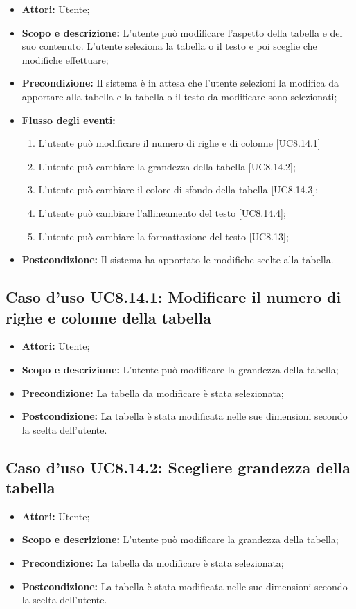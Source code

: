 \begin{itemize}
	\item \textbf{Attori:} Utente;
	\item \textbf{Scopo e descrizione:} L'utente può modificare l'aspetto della tabella e del suo contenuto. L'utente seleziona la tabella o il testo e poi sceglie che modifiche effettuare;
	\item \textbf{Precondizione:} Il sistema è in attesa che l'utente selezioni la modifica da apportare alla tabella e la tabella o il testo da modificare sono selezionati;
	\item \textbf{Flusso degli eventi:}
	\begin{enumerate}
		\item L'utente può modificare il numero di righe e di colonne [UC8.14.1]
		\item L'utente può cambiare la grandezza della tabella [UC8.14.2];
		\item L'utente può cambiare il colore di sfondo della tabella [UC8.14.3];
		\item L'utente può cambiare l'allineamento del testo [UC8.14.4];
		\item L'utente può cambiare la formattazione del testo [UC8.13];
	\end{enumerate}
	\item \textbf{Postcondizione:} Il sistema ha apportato le modifiche scelte alla tabella.
\end{itemize}

\subsection{Caso d'uso UC8.14.1: Modificare il numero di righe e colonne della tabella}
\begin{itemize}
	\item \textbf{Attori:} Utente;
	\item \textbf{Scopo e descrizione:} L'utente può modificare la grandezza della tabella;
	\item \textbf{Precondizione:} La tabella da modificare è stata selezionata;
	\item \textbf{Postcondizione:} La tabella è stata modificata nelle sue dimensioni secondo la scelta dell'utente.
\end{itemize}

\subsection{Caso d'uso UC8.14.2: Scegliere grandezza della tabella}
\begin{itemize}
	\item \textbf{Attori:} Utente;
	\item \textbf{Scopo e descrizione:} L'utente può modificare la grandezza della tabella;
	\item \textbf{Precondizione:} La tabella da modificare è stata selezionata;
	\item \textbf{Postcondizione:} La tabella è stata modificata nelle sue dimensioni secondo la scelta dell'utente.
\end{itemize}

